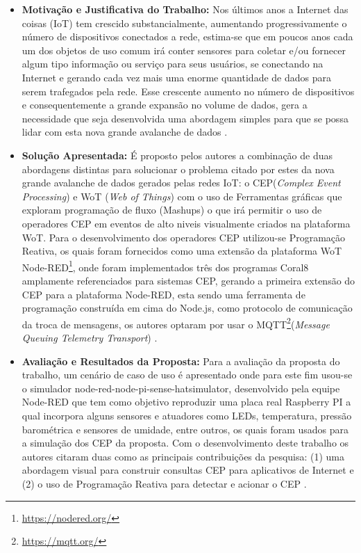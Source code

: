 \documentclass[tid,table]{texufpel} %
\begin{document}
\begin{itemize}
	\item \textbf{Motivação e Justificativa do Trabalho:} Nos últimos anos a Internet das coisas (IoT) tem crescido substancialmente, aumentando progressivamente o número de dispositivos conectados a rede, estima-se que em poucos anos cada um dos objetos de uso comum irá conter sensores para coletar e/ou fornecer algum tipo informação ou serviço para seus usuários, se conectando na Internet e gerando cada vez mais uma enorme quantidade de dados para serem trafegados pela rede. Esse crescente aumento no número de dispositivos e consequentemente a grande expansão no volume de dados, gera a necessidade que seja desenvolvida uma abordagem simples para que se possa lidar com esta nova grande avalanche de dados \cite{art2zimmerle2018web}.
	
	\item \textbf{Solução Apresentada:}  É proposto pelos autores a combinação de duas abordagens distintas para solucionar o problema citado por estes da nova grande avalanche de dados gerados pelas redes IoT: o CEP(\textit{Complex Event Processing}) e WoT (\textit{Web of Things}) com o uso de Ferramentas gráficas que exploram programação de fluxo (Mashups) o que irá permitir o uso de operadores CEP em eventos de alto niveis visualmente criados na plataforma WoT.
	Para o desenvolvimento dos operadores CEP utilizou-se Programação Reativa, os quais foram fornecidos como uma extensão da plataforma WoT Node-RED\footnote{\url{https://nodered.org/}}, onde foram implementados três dos programas Coral8 amplamente referenciados para sistemas CEP, gerando a primeira extensão do CEP para a plataforma Node-RED, esta sendo uma ferramenta de programação construída em cima do Node.js, como protocolo de comunicação da troca de mensagens, os autores optaram por usar o MQTT\footnote{\url{https://mqtt.org/}}(\textit{Message Queuing Telemetry Transport}) \cite{art2zimmerle2018web}. 	
	
	\item \textbf{Avaliação e Resultados da Proposta:} Para a avaliação da proposta do trabalho, um cenário de caso de uso é apresentado onde para este fim usou-se o simulador node-red-node-pi-sense-hatsimulator, desenvolvido pela equipe Node-RED que tem como objetivo reproduzir uma placa real Raspberry PI a qual incorpora alguns sensores e atuadores como LEDs, temperatura, pressão barométrica e sensores de umidade, entre outros, os quais foram usados para a simulação dos CEP da proposta. Com o desenvolvimento deste trabalho os autores citaram duas como as principais contribuições da pesquisa: (1) uma abordagem visual para construir consultas CEP para aplicativos de Internet e (2) o uso de Programação Reativa para detectar e acionar o CEP \cite{art2zimmerle2018web}.
	
\end{itemize}
\end{document}
